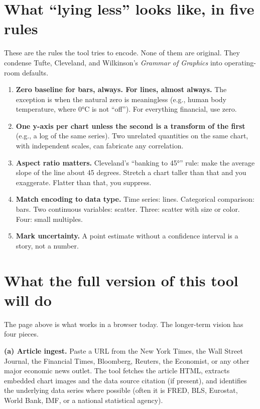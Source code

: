 \documentclass[
  letterpaper,
  11pt,
  twoside,
  openany]{scrbook}
\providecommand{\tightlist}{%
  \setlength{\itemsep}{0pt}\setlength{\parskip}{0pt}}
\begin{document}
\section{What ``lying less'' looks like, in five
rules}\label{what-lying-less-looks-like-in-five-rules}

These are the rules the tool tries to encode. None of them are original.
They condense Tufte, Cleveland, and Wilkinson's \emph{Grammar of
Graphics} into operating-room defaults.

\begin{enumerate}
\def\labelenumi{\arabic{enumi}.}
\tightlist
\item
  \textbf{Zero baseline for bars, always. For lines, almost always.} The
  exception is when the natural zero is meaningless (e.g., human body
  temperature, where 0°C is not ``off''). For everything financial, use
  zero.
\item
  \textbf{One y-axis per chart unless the second is a transform of the
  first} (e.g., a log of the same series). Two unrelated quantities on
  the same chart, with independent scales, can fabricate any
  correlation.
\item
  \textbf{Aspect ratio matters.} Cleveland's ``banking to 45°'' rule:
  make the average slope of the line about 45 degrees. Stretch a chart
  taller than that and you exaggerate. Flatter than that, you suppress.
\item
  \textbf{Match encoding to data type.} Time series: lines. Categorical
  comparison: bars. Two continuous variables: scatter. Three: scatter
  with size or color. Four: small multiples.
\item
  \textbf{Mark uncertainty.} A point estimate without a confidence
  interval is a story, not a number.
\end{enumerate}

\section{What the full version of this tool will
do}\label{what-the-full-version-of-this-tool-will-do}

The page above is what works in a browser today. The longer-term vision
has four pieces.

\textbf{(a) Article ingest.} Paste a URL from the New York Times, the
Wall Street Journal, the Financial Times, Bloomberg, Reuters, the
Economist, or any other major economic news outlet. The tool fetches the
article HTML, extracts embedded chart images and the data source
citation (if present), and identifies the underlying data series where
possible (often it is FRED, BLS, Eurostat, World Bank, IMF, or a
national statistical agency).
\end{document}
